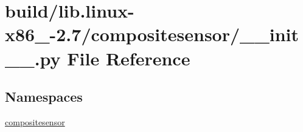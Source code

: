 \hypertarget{build_2lib_8linux-x86__64-2_87_2compositesensor_2____init_____8py}{}\section{build/lib.linux-\/x86\+\_-\/2.7/compositesensor/\+\_\+\+\_\+init\+\_\+\+\_\+.py File Reference}
\label{build_2lib_8linux-x86__64-2_87_2compositesensor_2____init_____8py}
\subsection*{Namespaces}
\begin{DoxyCompactItemize}
\item 
 \hyperlink{namespacecompositesensor}{compositesensor}
\end{DoxyCompactItemize}
